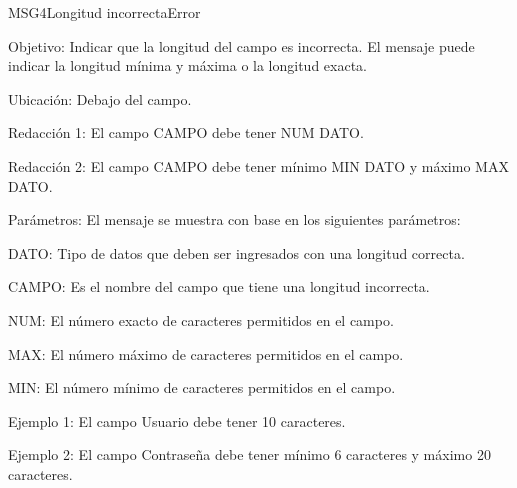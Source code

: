 
\begin{mensaje}{MSG4}{Longitud incorrecta}{Error}
	\item[Objetivo:] Indicar que la longitud del campo es incorrecta. El mensaje puede indicar la longitud mínima y máxima o la longitud exacta.
	\item[Ubicación:] Debajo del campo.
	\item[Redacción 1:] El campo CAMPO debe tener NUM DATO.
	\item[Redacción 2:] El campo CAMPO debe tener mínimo MIN DATO y máximo MAX DATO.
	\item[Parámetros:] El mensaje se muestra con base en los siguientes parámetros:
	\begin{Citemize}
		\item DATO: Tipo de datos que deben ser ingresados con una longitud correcta.
		\item CAMPO: Es el nombre del campo que tiene una longitud incorrecta.
		\item NUM: El número exacto de caracteres permitidos en el campo.
		\item MAX: El número máximo de caracteres permitidos en el campo.
		\item MIN: El número mínimo de caracteres permitidos en el campo.
	\end{Citemize}
	\item[Ejemplo 1:] El campo Usuario debe tener 10 caracteres.
	\item[Ejemplo 2:] El campo Contraseña debe tener mínimo 6 caracteres y máximo 20 caracteres.
\end{mensaje}

